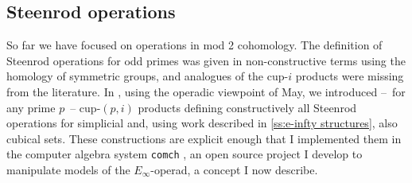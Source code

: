 %


\subsection{Steenrod operations} \label{ss:may steenrod}

So far we have focused on operations in mod 2 cohomology.
The definition of Steenrod operations for odd primes was given in non-constructive terms using the homology of symmetric groups, and analogues of the cup-$i$ products were missing from the literature.
In \cite{medina2021may_st}, using the operadic viewpoint of May, we introduced --~for any prime $p$~-- cup-$(p,i)$ products defining constructively all Steenrod operations for simplicial and, using work described in \cref{ss:e-infty structures}, also cubical sets.
These constructions are explicit enough that I implemented them in the computer algebra system \texttt{comch} \cite{medina2021comch}, an open source project I develop to manipulate models of the $E_\infty$-operad, a concept I now describe.

